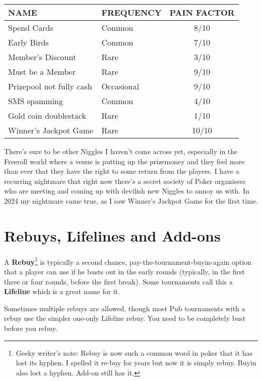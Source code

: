\begin{tabular}{|l|l|c|} \hline
NAME                     &  FREQUENCY  & PAIN FACTOR\\ \hline
Spend Cards              & Common      & 8/10       \\ \hline
Early Birds              & Common      & 7/10       \\ \hline
Member's Discount        & Rare        & 3/10       \\ \hline
Must be a Member         & Rare        & 9/10       \\ \hline
Prizepool not fully cash & Occasional  & 9/10       \\ \hline
SMS spamming             & Common      & 4/10       \\ \hline
Gold coin doublestack    & Rare        & 1/10       \\ \hline
Winner's Jackpot Game    & Rare        & 10/10      \\ \hline
\end{tabular}

There's sure to be other Niggles I haven't come across yet,
especially in the Freeroll world where a venue is putting up the
prizemoney and they feel more than ever that they have the right
to some return from the players. I have a recurring
nightmare that right now there's a secret society of Poker organisers
who are meeting and coming up with devilish new Niggles to annoy us with.
In 2024 my nightmare came true, as I saw Winner's Jackpot Game for
the first time.

\section{Rebuys, Lifelines and Add-ons}

A \textbf{Rebuy}\footnote{Geeky writer's note: Rebuy is now such a
  common word in poker that it has lost its hyphen. I spelled it
  re-buy for years but now it is simply rebuy. Buyin also lost a
  hyphen. Add-on still has it.}
is typically a second chance, pay-the-tournament-buyin-again
option that a player can use if he busts out in the early rounds
(typically, in the first three or four rounds, before the first
break). Some tournaments call this a \textbf{Lifeline} which is a
great name for it.

Sometimes multiple rebuys are allowed, though most Pub tournaments
with a rebuy use the simpler one-only Lifeline rebuy. You
need to be completely bust before you rebuy.

